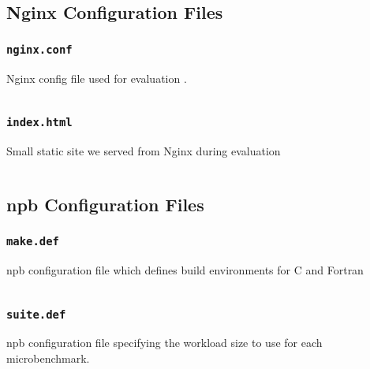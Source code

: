 \subsection{Nginx Configuration Files}\label{subsec:nginx}

\subsubsection{\texttt{nginx.conf}}
\begin{listing}[H]
  \caption{Nginx config file used for evaluation \af.}
    \label{lst:nginx-conf}
    \inputminted[fontsize=\small, frame=single,
    linenos]{python}{./listings/nginx/nginx_bench/nginx.conf}
\end{listing}

\subsubsection{\texttt{index.html}}
\begin{listing}[H]
  \caption{Small static site we served from Nginx during evaluation}
    \label{lst:index-html}
    \inputminted[fontsize=\small, frame=single,
    linenos]{html}{./listings/nginx/nginx_bench/html/index.html}
\end{listing}

\subsection{\acs{npb} Configuration Files}\label{subsec:npb}

\subsubsection{\texttt{make.def}}
\begin{listing}[H]
  \caption{\ac{npb} configuration file which defines build environments for C
  and Fortran}
    \label{lst:npb-make-def}
    \inputminted[fontsize=\small, frame=single,
    linenos]{make}{./listings/nbp/make.def}
\end{listing}

\subsubsection{\texttt{suite.def}}
\begin{listing}[H]
  \caption{\ac{npb} configuration file specifying the workload size to use for
  each microbenchmark.}
    \label{lst:npb-suite-def}
    \inputminted[fontsize=\small, frame=single,
    linenos]{text}{./listings/nbp/suite.def}
\end{listing}

